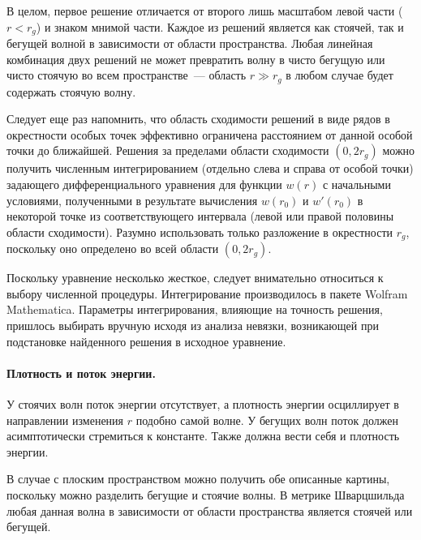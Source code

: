 \documentclass[\docroot/reports/draft/report.tex]{subfiles}
\begin{document}
        В целом, первое решение отличается от второго лишь масштабом левой части ($r < r_g$) и знаком мнимой части. Каждое из решений является как стоячей, так и бегущей волной в зависимости от области пространства. Любая линейная комбинация двух решений не может превратить волну в чисто бегущую или чисто стоячую во всем пространстве~--- область $r \gg r_g$ в любом случае будет содержать стоячую волну.

        Следует еще раз напомнить, что область сходимости решений в виде рядов в окрестности особых точек эффективно ограничена расстоянием от данной особой точки до ближайшей. Решения за пределами области сходимости $(0,2 r_g)$ можно получить численным интегрированием (отдельно слева и справа от особой точки) задающего дифференциального уравнения для функции $w(r)$ с начальными условиями, полученными в результате вычисления $w(r_0)$ и $w'(r_0)$ в некоторой точке из соответствующего интервала (левой или правой половины области сходимости). Разумно использовать только разложение в окрестности $r_g$, поскольку оно определено во всей области $(0,2 r_g)$.

        Поскольку уравнение несколько жесткое, следует внимательно относиться к выбору численной процедуры. Интегрирование производилось в пакете \foreignlanguage{english}{Wolfram Mathematica}. Параметры интегрирования, влияющие на точность решения, пришлось выбирать вручную исходя из анализа невязки, возникающей при подстановке найденного решения в исходное уравнение.

    \paragraph{Плотность и поток энергии.}

        У стоячих волн поток энергии отсутствует, а плотность энергии осциллирует в направлении изменения $r$ подобно самой волне. У бегущих волн поток должен асимптотически стремиться к константе. Также должна вести себя и плотность энергии.

        В случае с плоским пространством можно получить обе описанные картины, поскольку можно разделить бегущие и стоячие волны. В метрике Шварцшильда любая данная волна в зависимости от области пространства является стоячей или бегущей.
\end{document}
